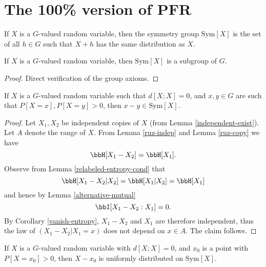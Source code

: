 \chapter{The 100\% version of PFR}

\begin{definition}\label{sym-group-def}
\leanok
If $X$ is a $G$-valued random variable, then the symmetry group $\mathrm{Sym}[X]$ is the set of all $h \in G$ such that $X +h$ has the same distribution as $X$.
\end{definition}

\begin{lemma}\label{sym-group}
\leanok
If $X$ is a $G$-valued random variable, then $\mathrm{Sym}[X]$ is a subgroup of $G$.
\end{lemma}

\begin{proof}\leanok Direct verification of the group axioms.
\end{proof}

\begin{lemma}\label{zero-large}
  \leanok  If $X$ is a $G$-valued random variable such that
  $d[X ;X]=0$, and $x,y \in G$ are such that $P[X=x], P[X=y]>0$, then $x-y \in \mathrm{Sym}[X]$.
\end{lemma}

\begin{proof}
  \leanok
   Let $X_1,X_2$ be independent copies of $X$ (from Lemma \ref{independent-exist}). Let $A$ denote the range of $X$.  From Lemma \ref{ruz-indep} and Lemma \ref{ruz-copy} we have
  $$ \bbH[X_1-X_2] = \bbH[X_1].$$
Observe from Lemma \ref{relabeled-entropy-cond} that
$$ \bbH[X_1-X_2|X_2] = \bbH[X_1|X_2] = \bbH[X_1]$$
and hence by Lemma \ref{alternative-mutual}
$$ \bbI[X_1-X_2 : X_1] = 0.$$
By Corollary \ref{vanish-entropy}, $X_1-X_2$ and $X_1$ are therefore independent, thus the law of $(X_1-X_2|X_1=x)$ does not depend on $x \in A$. The claim follows.
\end{proof}

\begin{lemma}\label{sym-zero}
\leanok
  If $X$ is a $G$-valued random variable with $d[X ;X]=0$, and $x_0$ is a point with $P[X=x_0] > 0$, then $X-x_0$ is uniformly distributed on $\mathrm{Sym}[X]$.
\end{lemma}

